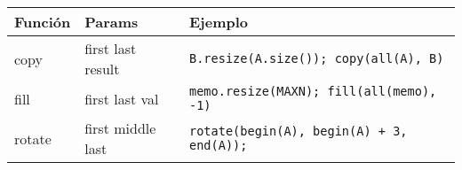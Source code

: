\\\\
\begin{tabular}{|l|l|p{9cm}|} \hline
\textbf{Función} & \textbf{Params}     & \textbf{Ejemplo}                             \\ \hline
    copy         & first last result   & \texttt{B.resize(A.size()); copy(all(A), B)}                                   \\ \hline
    fill         & first last val      & \texttt{memo.resize(MAXN); fill(all(memo), -1)}   \\ \hline
    rotate       & first middle last   & \texttt{rotate(begin(A), begin(A) + 3, end(A));}           \\ \hline
\end{tabular}
\\\\